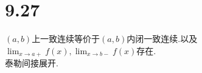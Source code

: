 \documentclass[a4paper]{ctexart}
\begin{document}
\noindent
\section{9.27}
$(a,b)$上一致连续等价于$(a,b)$内闭一致连续.以及$\lim_{x\to a+}f(x),\lim_{x\to b-}f(x)$存在.\\
泰勒间接展开.
\end{document}
